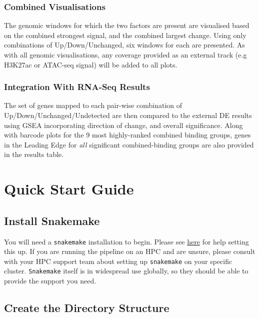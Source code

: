 \documentclass[
]{book}
\begin{document}
\hypertarget{combined-visualisations}{%
\subsection*{Combined Visualisations}\label{combined-visualisations}}

The genomic windows for which the two factors are present are visualised based on the combined strongest signal, and the combined largest change.
Using only combinations of Up/Down/Unchanged, six windows for each are presented.
As with all genomic visualisations, any coverage provided as an external track (e.g H3K27ac or ATAC-seq signal) will be added to all plots.

\hypertarget{integration-with-rna-seq-results}{%
\subsection*{Integration With RNA-Seq Results}\label{integration-with-rna-seq-results}}

The set of genes mapped to each pair-wise combination of Up/Down/Unchanged/Undetected are then compared to the external DE results using GSEA incorporating direction of change, and overall significance.
Along with barcode plots for the 9 most highly-ranked combined binding groups, genes in the Leading Edge for \emph{all} significant combined-binding groups are also provided in the results table.

\hypertarget{quick-start}{%
\chapter{Quick Start Guide}\label{quick-start}}

\hypertarget{snakemake}{%
\section{Install Snakemake}\label{snakemake}}

You will need a \texttt{snakemake} installation to begin.
Please see \href{https://snakemake.readthedocs.io/en/stable/getting_started/installation.html}{here} for help setting this up.
If you are running the pipeline on an HPC and are unsure, please consult with your HPC support team about setting up \texttt{snakemake} on your specific cluster.
\texttt{Snakemake} itself is in widespread use globally, so they should be able to provide the support you need.

\hypertarget{quick-directories}{%
\section{Create the Directory Structure}\label{quick-directories}}
\end{document}
